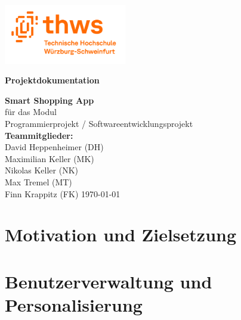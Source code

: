 \documentclass[12pt, a4paper]{report} %
\newcommand{\authorinitials}{} %
\begin{document}
\begin{titlepage}
    \begin{center}
        \includegraphics[width=0.4\textwidth]{media/THWS_logo.png}
    \end{center}
    \centering
    \vspace*{2cm}
    {\LARGE\bfseries Projektdokumentation \par}
    \vspace{1.5cm}
    {\Large \textbf{Smart Shopping App} \\[3mm]}
    \vspace{1cm}
    {\large für das Modul\\
      Programmierprojekt / Softwareentwicklungsprojekt\\}
    \vspace{1.5cm}
    {\large
      \textbf{Teammitglieder:}\\[5mm]
      David Heppenheimer (DH)\\
      Maximilian Keller (MK)\\
      Nikolas Keller (NK)\\
      Max Tremel (MT)\\
      Finn Krappitz (FK)
    }
    \vfill
    {\large \today}
\end{titlepage}

\tableofcontents
\cleardoublepage

\chapter{Motivation und Zielsetzung}










  




\chapter{Benutzerverwaltung und Personalisierung}
\renewcommand{\authorinitials}{FK}



\end{document}
